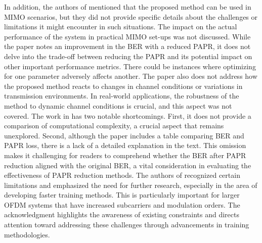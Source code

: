 \documentclass[conference]{IEEEtran}
\begin{document}
In addition, the authors of \cite{b145} mentioned that the proposed method can be used in MIMO scenarios, but they did not provide specific details about the challenges or limitations it might encounter in such situations. The impact on the actual performance of the system in practical MIMO set-ups was not discussed. While the paper notes an improvement in the BER with a reduced PAPR, it does not delve into the trade-off between reducing the PAPR and its potential impact on other important performance metrics. There could be instances where optimizing for one parameter adversely affects another. The paper also does not address how the proposed method reacts to changes in channel conditions or variations in transmission environments. In real-world applications, the robustness of the method to dynamic channel conditions is crucial, and this aspect was not covered. The work in \cite{b135} has two notable shortcomings. First, it does not provide a comparison of computational complexity, a crucial aspect that remains unexplored. Second, although the paper includes a table comparing BER and PAPR loss, there is a lack of a detailed explanation in the text. This omission makes it challenging for readers to comprehend whether the BER after PAPR reduction aligned with the original BER, a vital consideration in evaluating the effectiveness of PAPR reduction methods. The authors of \cite{b146} recognized certain limitations and emphasized the need for further research, especially in the area of developing faster training methods. This is particularly important for larger OFDM systems that have increased subcarriers and modulation orders. The acknowledgment highlights the awareness of existing constraints and directs attention toward addressing these challenges through advancements in training methodologies.
\end{document}
